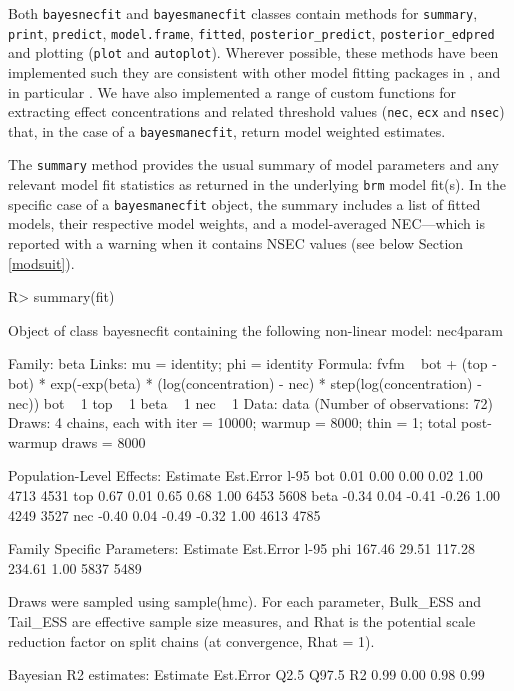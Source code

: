 \documentclass[
  shortnames]{jss}
\begin{document}
Both \texttt{bayesnecfit} and \texttt{bayesmanecfit} classes contain methods for \texttt{summary}, \texttt{print}, \texttt{predict}, \texttt{model.frame}, \texttt{fitted}, \texttt{posterior\_predict}, \texttt{posterior\_edpred} and plotting (\texttt{plot} and \newline \texttt{autoplot}). Wherever possible, these methods have been implemented such they are consistent with other model fitting packages in , and in particular . We have also implemented a range of custom functions for extracting effect concentrations and related threshold values (\texttt{nec}, \texttt{ecx} and \texttt{nsec}) that, in the case of a \texttt{bayesmanecfit}, return model weighted estimates.

The \texttt{summary} method provides the usual summary of model parameters and any relevant model fit statistics as returned in the underlying \texttt{brm} model fit(s). In the specific case of a \texttt{bayesmanecfit} object, the summary includes a list of fitted models, their respective model weights, and a model-averaged NEC---which is reported with a warning when it contains NSEC values (see below Section \ref{modsuit}).

\begin{CodeChunk}
\begin{CodeInput}
R> summary(fit)
\end{CodeInput}
\begin{CodeOutput}
Object of class bayesnecfit containing the following non-linear model: nec4param

 Family: beta 
  Links: mu = identity; phi = identity 
Formula: fvfm ~ bot + (top - bot) * exp(-exp(beta) * (log(concentration) - nec) * step(log(concentration) - nec)) 
         bot ~ 1
         top ~ 1
         beta ~ 1
         nec ~ 1
   Data: data (Number of observations: 72) 
  Draws: 4 chains, each with iter = 10000; warmup = 8000; thin = 1;
         total post-warmup draws = 8000

Population-Level Effects: 
     Estimate Est.Error l-95%
bot      0.01      0.00     0.00     0.02 1.00     4713     4531
top      0.67      0.01     0.65     0.68 1.00     6453     5608
beta    -0.34      0.04    -0.41    -0.26 1.00     4249     3527
nec     -0.40      0.04    -0.49    -0.32 1.00     4613     4785

Family Specific Parameters: 
    Estimate Est.Error l-95%
phi   167.46     29.51   117.28   234.61 1.00     5837     5489

Draws were sampled using sample(hmc). For each parameter, Bulk_ESS
and Tail_ESS are effective sample size measures, and Rhat is the potential
scale reduction factor on split chains (at convergence, Rhat = 1).


Bayesian R2 estimates:
   Estimate Est.Error Q2.5 Q97.5
R2     0.99      0.00 0.98  0.99
\end{CodeOutput}
\end{CodeChunk}
\end{document}
